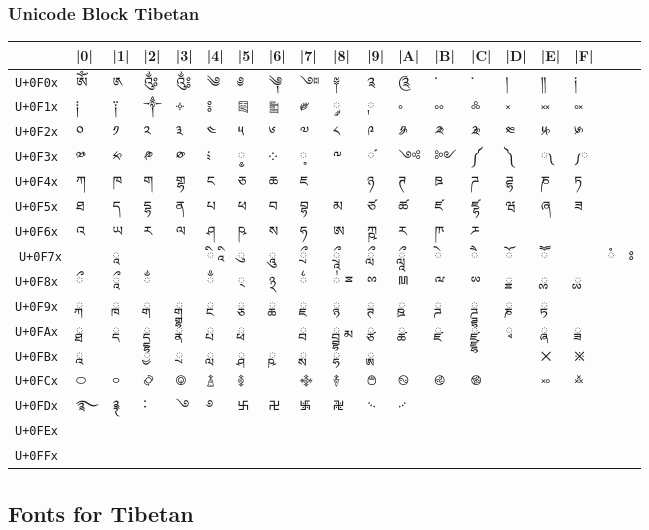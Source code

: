 \subsubsection{Unicode Block Tibetan}


\bgroup\large
\begin{tabular}{llllllllllllllll l}
\toprule
	           &|0|	&|1|	&|2|	&|3|	&|4|	&|5|	&|6|	&|7|	&|8|	&|9|	&|A|	&|B|	&|C|	&|D|	&|E|	&|F|\\
\midrule
\texttt{U+0F0x}	&ༀ	&༁	&༂	&༃	&༄	&༅	&༆	&༇	&༈	&༉	&༊	&་	&༌  &	།	&༎	&༏\\
\midrule
\texttt{U+0F1x} &༐	&༑	&༒	&༓	&༔	&༕	&༖	&༗	&༘&	༙	&༚	&༛	&༜	&༝	&༞	&༟\\
\midrule
\texttt{U+0F2x} &༠	&༡	&༢	&༣	&༤	&༥	&༦	&༧	&༨	&༩	&༪	&༫	&༬	&༭	&༮	&༯\\
\midrule
\texttt{U+0F3x}	&༰ &༱	 &༲ &༳	&༴ &༵	&༶ & ༷	&༸&	༹	&༺&	༻	&༼&	༽	&༾	&༿\\
\midrule
\texttt{U+0F4x} &ཀ	&ཁ	&ག	&གྷ	&ང	&ཅ	&ཆ	&ཇ	&	&ཉ	&ཊ	&ཋ	&ཌ	&ཌྷ	&ཎ	&ཏ\\
\midrule
\texttt{U+0F5x}	 &ཐ	&ད	&དྷ	&ན	&པ	&ཕ	&བ	&བྷ	&མ	&ཙ	&ཚ	&ཛ	&ཛྷ	&ཝ	&ཞ	&ཟ\\
\midrule
\texttt{U+0F6x} &འ	&ཡ	&ར	&ལ	&ཤ	&ཥ	&ས	&ཧ	&ཨ	&ཀྵ	&ཪ	&ཫ	&ཬ	&&&\\
^^A\texttt{U+0F7x}&&	ཱ &	& &ི	ཱི&	ུ&	ཱུ&	ྲྀ&	ཷ&	ླྀ&	ཹ&	ེ&	ཻ&	ོ&	ཽ&	&ཾ	&ཿ\\
\midrule
\texttt{U+0F8x}&    ྀ   & 	ཱྀ&	ྂ&	&ྃ &	྄	&྅&	྆	&྇	ྈ&	ྉ&	ྊ&	ྋ&	ྌ&	ྍ&	ྎ&	ྏ\\
\midrule
\texttt{U+0F9x} &	ྐ&	ྑ   & 	ྒ &	ྒྷ &	ྔ &	ྕ &	ྖ &	ྗ &		ྙ &	ྚ &	ྛ &	ྜ &	ྜྷ &	ྞ &	ྟ\\
\texttt{U+0FAx} &	ྠ &	ྡ &	ྡྷ &	ྣ &	ྤ &	ྥ &		&ྦ	&ྦྷ	ྨ&	ྩ&	ྪ&	ྫ&	ྫྷ&	ྭ&	ྮ&	ྯ\\
\midrule
\texttt{U+0FBx} 
&	  ྰ 
&	
& ྱ  	 
&ྲ	
&ླ	
&ྴ
&	ྵ
&	ྶ
&	ྷ
&ྸ
&
&
&
&	
&྾	
&྿\\
\midrule
\texttt{U+0FCx}	 &࿀&	࿁&	࿂&	࿃&	࿄&	࿅&	&࿇	&࿈	&࿉	&࿊	&࿋	&࿌	&&	࿎	&࿏\\
\midrule
\texttt{U+0FDx}	&࿐	&࿑	&࿒	&࿓	&࿔	&࿕	&࿖	&࿗	&࿘	&࿙	&࿚	&&&&&\\
\midrule
\texttt{U+0FEx} &&&&&&&&&&&&&&&&\\
\midrule
\texttt{U+0FFx}  &&&&&&&&&&&&&&&&\\
\bottomrule
\end{tabular}
\egroup




\subsection{Fonts for Tibetan}

